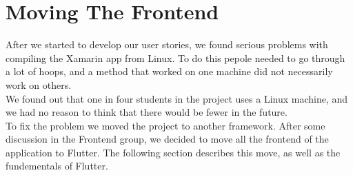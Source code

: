 \section{Moving The Frontend}

After we started to develop our user stories, we found serious problems with compiling the Xamarin app from Linux. To do this pepole needed to go through a lot of hoops, and a method that worked on one machine did not necessarily work on others.\\
We found out that one in four students in the project uses a Linux machine, and we had no reason to think that there would be fewer in the future.\\
To fix the problem we moved the project to another framework. After some discussion in the Frontend group, we decided to move all the frontend of the application to Flutter. The following section describes this move, as well as the fundementals of Flutter. 


